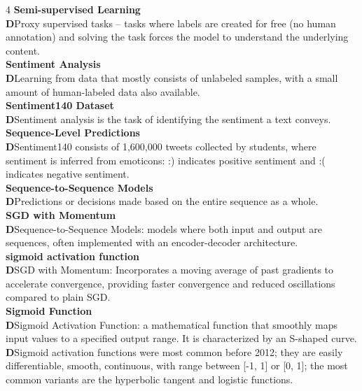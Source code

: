 \documentclass[8pt]{extarticle}
\newcommand{\dtag}{\textcolor{definitioncolor}{\tiny\textbf{D}}\;}
\begin{document}
\begin{multicols}{4}
\vspace{2pt}\textbf{Semi-supervised Learning}\\
\dtag Proxy supervised tasks -- tasks where labels are created for free (no human annotation) and solving the task forces the model to understand the underlying content.\\
\vspace{2pt}\textbf{Sentiment Analysis}\\
\dtag Learning from data that mostly consists of unlabeled samples, with a small amount of human-labeled data also available.\\
\vspace{2pt}\textbf{Sentiment140 Dataset}\\
\dtag Sentiment analysis is the task of identifying the sentiment a text conveys.\\
\vspace{2pt}\textbf{Sequence-Level Predictions}\\
\dtag Sentiment140 consists of 1,600,000 tweets collected by students, where sentiment is inferred from emoticons: :) indicates positive sentiment and :( indicates negative sentiment.\\
\vspace{2pt}\textbf{Sequence-to-Sequence Models}\\
\dtag Predictions or decisions made based on the entire sequence as a whole.\\
\vspace{2pt}\textbf{SGD with Momentum}\\
\dtag Sequence-to-Sequence Models: models where both input and output are sequences, often implemented with an encoder-decoder architecture.\\
\vspace{2pt}\textbf{sigmoid activation function}\\
\dtag SGD with Momentum: Incorporates a moving average of past gradients to accelerate convergence, providing faster convergence and reduced oscillations compared to plain SGD.\\
\vspace{2pt}\textbf{Sigmoid Function}\\
\dtag Sigmoid Activation Function: a mathematical function that smoothly maps input values to a specified output range. It is characterized by an S-shaped curve.\\
\dtag Sigmoid activation functions were most common before 2012; they are easily differentiable, smooth, continuous, with range between [-1, 1] or [0, 1]; the most common variants are the hyperbolic tangent and logistic functions.\\

\end{multicols}
\end{document}
